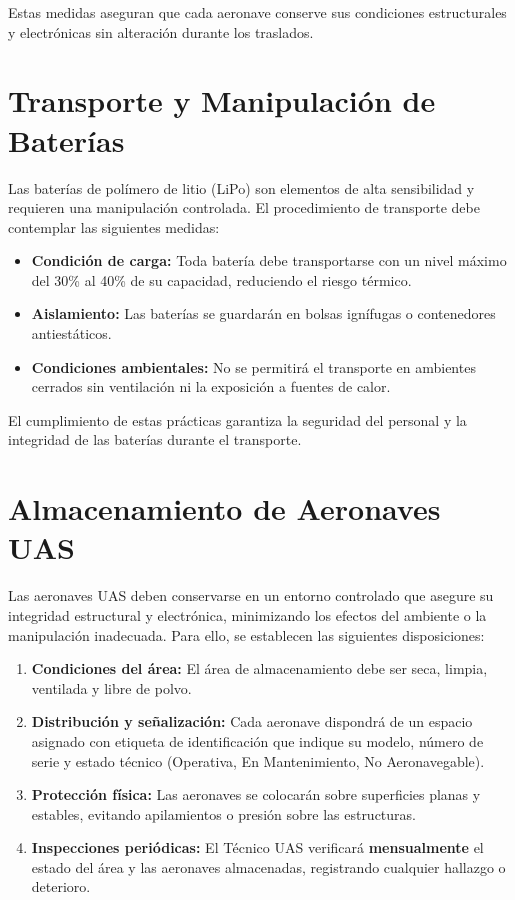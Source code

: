 Estas medidas aseguran que cada aeronave conserve sus condiciones estructurales y electrónicas sin alteración durante los traslados.

\section{Transporte y Manipulación de Baterías}

Las baterías de polímero de litio (LiPo) son elementos de alta sensibilidad y requieren una manipulación controlada. El procedimiento de transporte debe contemplar las siguientes medidas:

\begin{itemize}
    \item \textbf{Condición de carga:} Toda batería debe transportarse con un nivel máximo del 30\% al 40\% de su capacidad, reduciendo el riesgo térmico.

    \item \textbf{Aislamiento:} Las baterías se guardarán en bolsas ignífugas o contenedores antiestáticos.

    \item \textbf{Condiciones ambientales:} No se permitirá el transporte en ambientes cerrados sin ventilación ni la exposición a fuentes de calor.

\end{itemize}

El cumplimiento de estas prácticas garantiza la seguridad del personal y la integridad de las baterías durante el transporte.

\section{Almacenamiento de Aeronaves UAS}
Las aeronaves UAS deben conservarse en un entorno controlado que asegure su integridad estructural y electrónica, minimizando los efectos del ambiente o la manipulación inadecuada. Para ello, se establecen las siguientes disposiciones:

\begin{enumerate}
    \item \textbf{Condiciones del área:} El área de almacenamiento debe ser seca, limpia, ventilada y libre de polvo.

    \item \textbf{Distribución y señalización:} Cada aeronave dispondrá de un espacio asignado con etiqueta de identificación que indique su modelo, número de serie y estado técnico (Operativa, En Mantenimiento, No Aeronavegable).

    \item \textbf{Protección física:} Las aeronaves se colocarán sobre superficies planas y estables, evitando apilamientos o presión sobre las estructuras.

    \item \textbf{Inspecciones periódicas:} El Técnico UAS verificará \textbf{mensualmente} el estado del área y las aeronaves almacenadas, registrando cualquier hallazgo o deterioro.

\end{enumerate}

